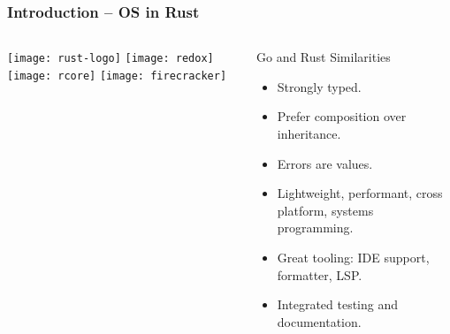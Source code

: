 \begin{frame}[plain]
	\frametitle{Introduction -- OS in Rust}
	
	
	
	\begin{columns}
		
		\begin{column}{.2\textwidth}
			
			\texttt{[image: rust-logo]}
			\texttt{[image: redox]}
			\texttt{[image: rcore]}
			\texttt{[image: firecracker]}
		\end{column}
		
		\begin{column}{.8\textwidth}
			
			Go and Rust Similarities
			
			\begin{itemize}
				
				\item  Strongly typed.
				
				\item Prefer composition over inheritance.
				
				\item Errors are values.
				
				\item  Lightweight, performant, cross platform, systems programming.
				
				\item Great tooling: IDE support, formatter, LSP.
				
				\item Integrated testing and documentation.
			\end{itemize}
			
		\end{column}
		
		
	\end{columns}
	
	
\end{frame}


